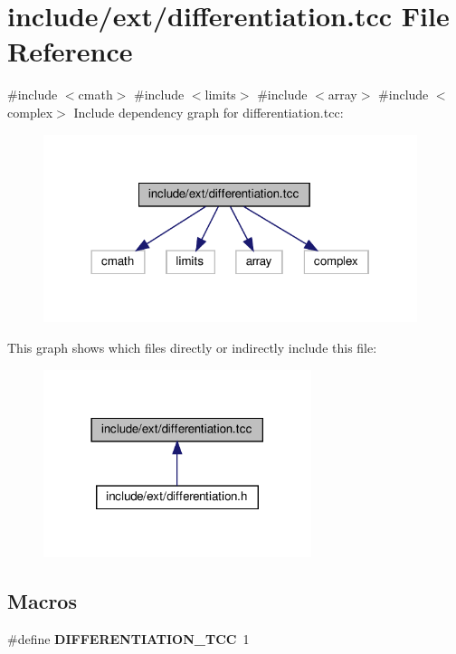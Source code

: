 \hypertarget{differentiation_8tcc}{}\section{include/ext/differentiation.tcc File Reference}
\label{differentiation_8tcc}
{\ttfamily \#include $<$cmath$>$}\newline
{\ttfamily \#include $<$limits$>$}\newline
{\ttfamily \#include $<$array$>$}\newline
{\ttfamily \#include $<$complex$>$}\newline
Include dependency graph for differentiation.\+tcc\+:\nopagebreak
\begin{figure}[H]
\begin{center}
\leavevmode
\includegraphics[width=310pt]{differentiation_8tcc__incl}
\end{center}
\end{figure}
This graph shows which files directly or indirectly include this file\+:\nopagebreak
\begin{figure}[H]
\begin{center}
\leavevmode
\includegraphics[width=222pt]{differentiation_8tcc__dep__incl}
\end{center}
\end{figure}
\subsection*{Macros}
\begin{DoxyCompactItemize}
\item 
\mbox{\label{differentiation_8tcc_aba2d54628bdc01e26d172ef294c3e0f8}} 
\#define {\bfseries D\+I\+F\+F\+E\+R\+E\+N\+T\+I\+A\+T\+I\+O\+N\+\_\+\+T\+CC}~1
\end{DoxyCompactItemize}
